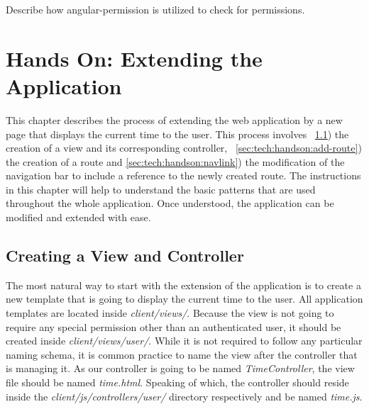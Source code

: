 \documentclass[nochapterpage,nopartpage,noheadingspace,numbersubsubsec,bigchapter,colorback,accentcolor=tud9c,10pt]{tudreport}
\begin{document}
    Describe how angular-permission is utilized to check for permissions.

  \chapter{Hands On: Extending the Application}
  \label{ch:tech:handson}

    This chapter describes the process of extending the web application by a new page that displays the current time to the user. This process involves ~\ref{sec:tech:handson:add-vc}) the creation of a view and its corresponding controller, ~\ref{sec:tech:handson:add-route}) the creation of a route and \ref{sec:tech:handson:navlink}) the modification of the navigation bar to include a reference to the newly created route. The instructions in this chapter will help to understand the basic patterns that are used throughout the whole application. Once understood, the application can be modified and extended with ease.

  \section{Creating a View and Controller}
  \label{sec:tech:handson:add-vc}

    The most natural way to start with the extension of the application is to create a new template that is going to display the current time to the user. All application templates are located inside \emph{client/views/}. Because the view is not going to require any special permission other than an authenticated user, it should be created inside \emph{client/views/user/}. While it is not required to follow any particular naming schema, it is common practice to name the view after the controller that is managing it. As our controller is going to be named \emph{TimeController}, the view file should be named \emph{time.html}. Speaking of which, the controller should reside inside the \emph{client/js/controllers/user/} directory respectively and be named \emph{time.js}.
\end{document}
